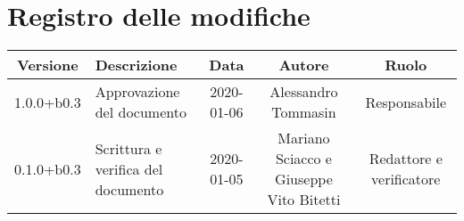 \section*{Registro delle modifiche}

\begin{center}
	\begin{longtable}{|c|p{3cm}|c|c|c|}
	\hline
	\rowcolor{lighter-grayer}
	\textbf{Versione} & \textbf{Descrizione} & \textbf{Data} & \textbf{Autore} & \textbf{Ruolo} \\
	\hline
	\endfirsthead


	1.0.0+b0.3 & Approvazione del documento & 2020-01-06 & Alessandro Tommasin & Responsabile \\
	\hline
	0.1.0+b0.3 & Scrittura e verifica del documento & 2020-01-05 & Mariano Sciacco e Giuseppe Vito Bitetti & Redattore e verificatore \\
	\hline

	\end{longtable}
\end{center}